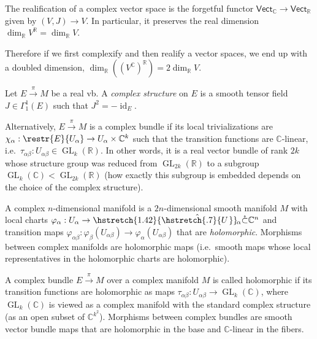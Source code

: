 \documentclass[english,letterpaper]{article}%
\numberwithin{equation}{section}
\numberwithin{figure}{section}
\numberwithin{table}{section}
\theoremstyle{definition}
\theoremstyle{definition}
\theoremstyle{definition}
\theoremstyle{plain}
\theoremstyle{plain}
\theoremstyle{plain}
\theoremstyle{plain}
\theoremstyle{remark}
\theoremstyle{remark}
\DeclareMathOperator{\id}{id}
\DeclareMathOperator{\GL}{GL}
\newcommand\wh[1]{\hstretch{1.42}{\hat{\hstretch{.7}{#1\mkern2mu}}}\mkern-2mu} %
\begin{document}
\begin{defn}[Realification]
    The realification of a complex vector space is the forgetful functor $\mathsf{Vect}_\mathbb{C}\to\mathsf{Vect}_\mathbb{R}$ given by $(V,J)\to V$. In particular, it preserves the real dimension $\dim_\mathbb{R}V^\mathbb{R}=\dim_\mathbb{R} V$.
\end{defn}

Therefore if we first complexify and then realify a vector spaces, we end up with a doubled dimension, $\dim_\mathbb{R}\left(\left(V^\mathbb{C}\right)^\mathbb{R}\right)=2\dim_\mathbb{R} V$.

\begin{defn}
    Let $E\overset\pi\to M$ be a real \gls{vb}. A \emph{complex structure} on $E$ is a smooth tensor field $J\in\Gamma^1_1(E)$ such that $J^2=-\id_E$.
    
    Alternatively, $E\overset\pi\to M$ is a complex bundle if its local trivializations are $\chi_\alpha:\restr{E}{U_\alpha}\to U_\alpha\times \mathbb{C}^k$ such that the transition functions are $\mathbb{C}$-linear, i.e.\ $\tau_{\alpha\beta}:U_{\alpha\beta}\in \GL_k(\mathbb{R})$. In other words, it is a real vector bundle of rank $2k$ whose structure group was reduced from $\GL_{2k}(\mathbb{R})$ to a subgroup $\GL_k(\mathbb{C})<\GL_{2k}(\mathbb{R})$ (how exactly this subgroup is embedded depends on the choice of the complex structure).
\end{defn}

\begin{defn}
    A complex $n$-dimensional manifold is a $2n$-dimensional smooth manifold $M$ with local charts $\varphi_\alpha:U_\alpha\to\wh{U}_\alpha\mathring\subset\mathbb{C}^n$ and transition maps $\varphi_{\alpha\beta}:\varphi_\beta(U_{\alpha\beta})\to\varphi_\alpha(U_{\alpha\beta})$ that are \emph{holomorphic}. Morphisms between complex manifolds are holomorphic maps (i.e.\ smooth maps whose local representatives in the holomorphic charts are holomorphic).
\end{defn}


\begin{defn}
    A complex bundle $E\overset\pi\to M$ over a complex manifold $M$ is called holomorphic if its transition functions are holomorphic as maps $\tau_{\alpha\beta}:U_{\alpha\beta}\to \GL_k(\mathbb{C})$, where $\GL_k(\mathbb{C})$ is viewed as a complex manifold with the standard complex structure (as an open subset of $\mathbb{C}^{k^2}$). Morphisms between complex bundles are smooth vector bundle maps that are holomorphic in the base and $\mathbb{C}$-linear in the fibers.
\end{defn}
\end{document}
